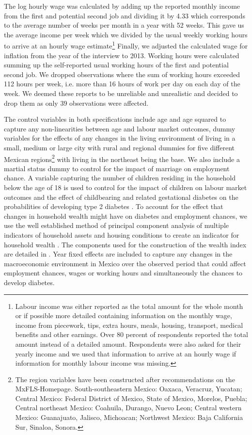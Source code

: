The log hourly wage was calculated by adding up the reported monthly income from the first and potential second job and dividing it by 4.33 which corresponds to the average number of weeks per month in a year with 52 weeks. This gave us the average income per week which we divided by the usual weekly working hours to arrive at an hourly wage estimate\footnote{Labour income was either reported as the total amount for the whole month or if possible more detailed containing information on the monthly wage, income from piecework, tips, extra hours, meals, housing, transport, medical benefits and other earnings. Over 80 percent of respondents reported the total amount instead of a detailed amount. Respondents were also asked for their yearly income and we used that information to arrive at an hourly wage if information for monthly labour income was missing.} Finally, we adjusted the calculated wage for inflation from the year of the interview to 2013.  Working hours were calculated summing up the self-reported usual working hours of the first and potential second job. We dropped observations where the sum of working hours exceeded 112 hours per week, i.e. more than 16 hours of work per day on each day of the week. We deemed these reports to be unreliable and unrealistic and decided to drop them as only 39 observations were affected. 

The control variables in both specifications include
age and age squared to capture any non-linearities between age and
labour market outcomes, dummy variables for the effects of any changes
in the living environment of living in a small, medium or large city
with rural and regional dummies for five different Mexican regions\footnote{The region variables have been constructed after recommendations on
the MxFLS-Homepage. South-southeastern Mexico: Oaxaca, Veracruz, Yucatan;
Central Mexico: Federal District of Mexico, State of Mexico, Morelos,
Puebla; Central northeast Mexico: Coahuila, Durango, Nuevo Leon; Central
western Mexico: Guanajuato, Jalisco, Michoacan; Northwest Mexico:
Baja California Sur, Sinaloa, Sonora.} with living in the northeast being the base. We also include a martial
status dummy to control for the impact of marriage on employment chance.
A variable capturing the number of children residing in the household
below the age of 18 is used to control for the impact of children
on labour market outcomes and the effect of childbearing and related
gestational diabetes on the probabilities of developing type 2 diabetes
\citep{Bellamy2009}. To account for the effect that changes in household
wealth might have on diabetes and employment chances, we use the well
established method of principal component analysis of multiple indicators
of household assets and housing conditions to create an indicator
for household wealth \citep{Filmer2001}. The components used for
the construction of the wealth index are detailed in \citet{Seuring2015}.
Year fixed effects are included to capture any changes in the macroeconomic
environment in Mexico over the observed period that could affect employment
chances, wages or working hours and simultaneously the chances to
develop diabetes.

